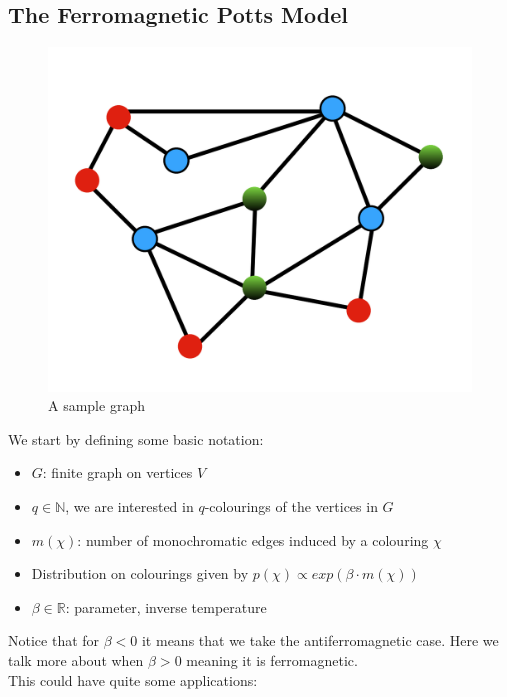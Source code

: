 \documentclass{article}
\begin{document}
\subsection{The Ferromagnetic Potts Model}

\begin{figure}[h]
\centering
\includegraphics[scale=0.8]{media/sample-graph.png}
\caption{A sample graph}
\label{fig:sample-graph}
\end{figure}

\noindent We start by defining some basic notation:

\begin{itemize}
    \item $G$: finite graph on vertices $V$
    \item $q \in \mathbb{N}$, we are interested in $q$-colourings of the vertices in $G$
    \item $m(\chi)$: number of monochromatic edges induced by a colouring $\chi$
    \item Distribution on colourings given by $p(\chi) \propto exp(\beta \cdot m(\chi))$
    \item $\beta \in \mathbb{R}$: parameter, inverse temperature
\end{itemize}

\noindent Notice that for $\beta < 0$ it means that we take the antiferromagnetic case. Here we talk more about when $\beta > 0$ meaning it is ferromagnetic.\\

\noindent This could have quite some applications:
\end{document}
